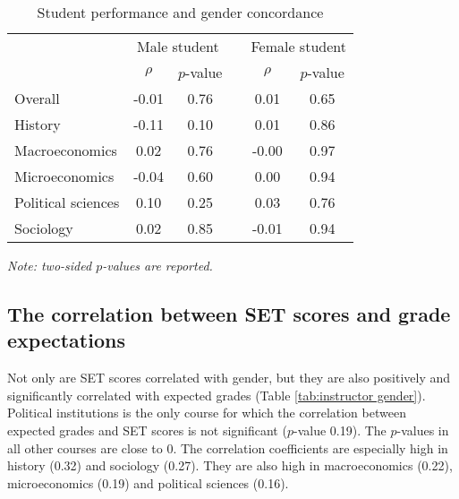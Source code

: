 \documentclass[12pt]{article}
\begin{document}
\begin{table}[htbp]
  \centering
  \footnotesize 
  \caption{Student performance and gender concordance}
    \begin{tabular}{lccccc}
    \toprule 
          & \multicolumn{2}{c}{Male student}  &  & \multicolumn{2}{c}{Female student} \\
      & $\rho$  &  $p$-value &  & $\rho$  &  $p$-value    \\
                             \midrule
      \quad  Overall &                 -0.01       & 0.76 & &  0.01       & 0.65  \\
      \quad  History &                 -0.11       & 0.10 & &  0.01       & 0.86   \\
      \quad  Macroeconomics &           0.02       & 0.76 & & -0.00       & 0.97   \\
      \quad  Microeconomics &          -0.04       & 0.60 & &  0.00       & 0.94  \\
      \quad  Political sciences &       0.10       & 0.25 & &  0.03       & 0.76  \\
      \quad  Sociology &                0.02       & 0.85 & & -0.01       & 0.94  \\
    \bottomrule
    \end{tabular}%
 \label{tab:finalconcordance}%
  
  \textit{Note: two-sided $p$-values are reported.}
\end{table}%
\normalsize





\subsection{The correlation between SET scores and grade expectations}

Not only are SET scores correlated with gender, but they are also positively and significantly correlated with expected grades (Table \ref{tab:instructor gender}). Political institutions is the only course for which the correlation between expected grades and SET scores is not significant ($p$-value 0.19). The $p$-values in all other courses are close to 0. The correlation coefficients are especially high in history (0.32) and sociology (0.27). They are also high in macroeconomics (0.22), microeconomics (0.19) and political sciences (0.16).
\end{document}
